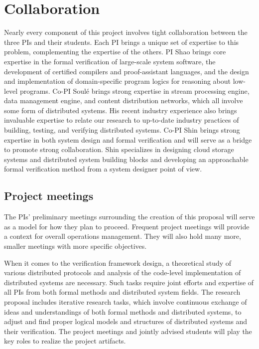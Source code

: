\documentclass[11pt]{article}
\begin{document}
\section{Collaboration}

Nearly every component of this project involves tight collaboration
between the three PIs and their students. Each PI brings a unique set
of expertise to this problem, complementing the expertise of the
others. PI Shao brings core expertise in the formal verification of
large-scale system software, the development of certified compilers
and proof-assistant languages,  and the design and
implementation of domain-specific program logics for reasoning about
low-level programs. Co-PI Soul\'e brings strong expertise in stream
processing engine, data management engine, and 
content distribution networks, which all involve some form of
distributed systems. His recent industry experience also brings
invaluable expertise to relate our research to up-to-date industry 
practices of building, testing, and verifying distributed systems. 
Co-PI Shin brings strong expertise in both system design and formal
verification and will serve as a bridge to promote strong collaboration.
Shin specializes in designing cloud storage systems and 
distributed system building blocks and developing an approachable
formal verification method from a system designer point of view. 

\subsection{Project meetings}

The PIs' preliminary meetings surrounding the creation of this
proposal will serve as a model for how they plan to proceed. Frequent
project meetings will provide a context for overall operations
management. They will also hold many more, smaller meetings
with more specific objectives.

When it comes to the verification framework design, a theoretical
study of various distributed protocols and analysis of the code-level 
implementation of distributed systems are necessary. Such tasks require
joint efforts and expertise of all PIs from both formal methods and 
distributed system fields. The research proposal includes 
iterative research tasks, which involve continuous exchange 
of ideas and understandings of both formal methods and distributed 
systems, to adjust and find proper logical models and structures
of distributed systems and their verification. The project meetings 
and jointly advised students will play the key roles to realize the 
project artifacts. 
\end{document}
